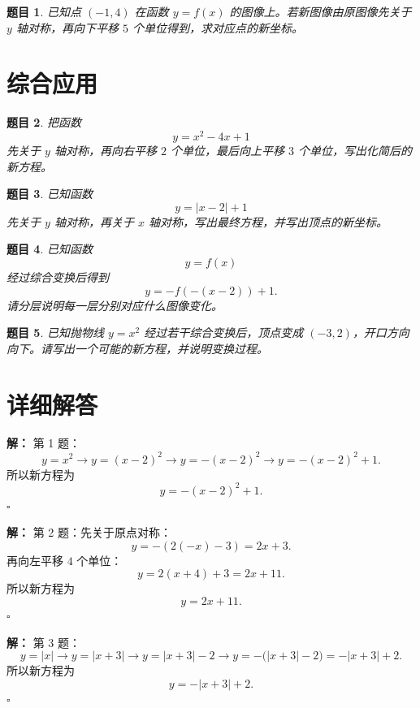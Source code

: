 \documentclass[11pt,a4paper,fontset=fandol]{ctexart}
\theoremstyle{formalexample}
\newtheorem{exercise}{题目}[section]
\newenvironment{solution}{\par\noindent\textbf{解：}}{\hfill$\square$\par}
\begin{document}
\begin{exercise}
已知点 \((-1,4)\) 在函数 \(y=f(x)\) 的图像上。若新图像由原图像先关于 \(y\) 轴对称，再向下平移 $5$ 个单位得到，求对应点的新坐标。
\end{exercise}

\section{综合应用}

\begin{exercise}
把函数
\[
y=x^2-4x+1
\]
先关于 \(y\) 轴对称，再向右平移 $2$ 个单位，最后向上平移 $3$ 个单位，写出化简后的新方程。
\end{exercise}

\begin{exercise}
已知函数
\[
y=|x-2|+1
\]
先关于 \(y\) 轴对称，再关于 \(x\) 轴对称，写出最终方程，并写出顶点的新坐标。
\end{exercise}

\begin{exercise}
已知函数
\[
y=f(x)
\]
经过综合变换后得到
\[
y=-f(-(x-2))+1.
\]
请分层说明每一层分别对应什么图像变化。
\end{exercise}

\begin{exercise}
已知抛物线 \(y=x^2\) 经过若干综合变换后，顶点变成 \((-3,2)\)，开口方向向下。请写出一个可能的新方程，并说明变换过程。
\end{exercise}

\section{详细解答}

\begin{solution}
第 1 题：
\[
y=x^2 \rightarrow y=(x-2)^2 \rightarrow y=-(x-2)^2 \rightarrow y=-(x-2)^2+1.
\]
所以新方程为
\[
\boxed{y=-(x-2)^2+1}.
\]
\end{solution}

\begin{solution}
第 2 题：先关于原点对称：
\[
y=-(2(-x)-3)=2x+3.
\]
再向左平移 $4$ 个单位：
\[
y=2(x+4)+3=2x+11.
\]
所以新方程为
\[
\boxed{y=2x+11}.
\]
\end{solution}

\begin{solution}
第 3 题：
\[
y=|x| \rightarrow y=|x+3| \rightarrow y=|x+3|-2 \rightarrow y=-\bigl(|x+3|-2\bigr)=-|x+3|+2.
\]
所以新方程为
\[
\boxed{y=-|x+3|+2}.
\]
\end{solution}
\end{document}
